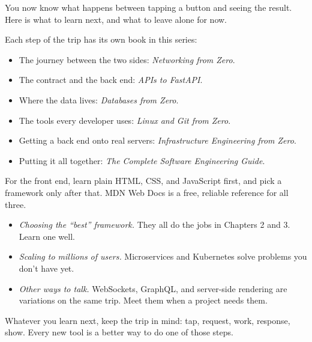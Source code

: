 \label{ch:webapp-06}

\chapterrule

You now know what happens between tapping a button and seeing the result. Here is what to learn next, and what to leave alone for now.

\label{webapp-06:what-to-learn-next}

Each step of the trip has its own book in this series:

\begin{itemize}
\tightlist
\item
  The journey between the two sides: \emph{Networking from Zero}.
\item
  The contract and the back end: \emph{APIs to FastAPI}.
\item
  Where the data lives: \emph{Databases from Zero}.
\item
  The tools every developer uses: \emph{Linux and Git from Zero}.
\item
  Getting a back end onto real servers: \emph{Infrastructure Engineering from Zero}.
\item
  Putting it all together: \emph{The Complete Software Engineering Guide}.
\end{itemize}

\noindent{}For the front end, learn plain HTML, CSS, and JavaScript first, and pick a framework only after that. MDN Web Docs is a free, reliable reference for all three.

\label{webapp-06:what-to-skip-for-now}

\begin{itemize}
\tightlist
\item
  \emph{Choosing the ``best'' framework.} They all do the jobs in Chapters 2 and 3. Learn one well.
\item
  \emph{Scaling to millions of users.} Microservices and Kubernetes solve problems you don't have yet.
\item
  \emph{Other ways to talk.} WebSockets, GraphQL, and server-side rendering are variations on the same trip. Meet them when a project needs them.
\end{itemize}

\noindent{}Whatever you learn next, keep the trip in mind: tap, request, work, response, show. Every new tool is a better way to do one of those steps.
